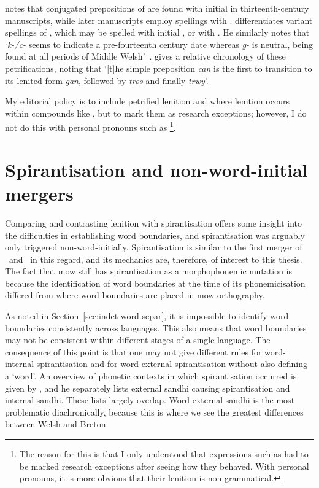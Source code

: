 \Textcite[52]{jongeleen_lenition_2016} notes that conjugated prepositions of  are found with initial   in thirteenth-century manuscripts, while later manuscripts employ spellings with .
\Textcite{sims-williams_variation_2013} differentiates variant spellings of , which may be spelled with initial , or with .
He similarly notes that `\textit{k-/c-} seems to indicate a pre-fourteenth century date whereas \textit{g-} is neutral, being found at all periods of Middle Welsh'~\autocite[24]{sims-williams_variation_2013}. \Textcite[55]{jongeleen_lenition_2016} gives a relative chronology of these petrifications, noting that `[t]he simple preposition \textit{can} is the first to transition to its lenited form \textit{gan}, followed by \textit{tros} and finally \textit{trwy}'.

My editorial policy is to include petrified lenition and where lenition occurs within compounds like , but to mark them as research exceptions; however, I do not do this with personal pronouns such as \footnote{The reason for this is that I only understood that expressions such as  had to be marked research exceptions after seeing how they behaved. With personal pronouns, it is more obvious that their lenition is non-grammatical.}.

\section{Spirantisation and non-word-initial mergers}
\label{sec:spirantization}

Comparing and contrasting lenition with spirantisation offers some insight into the difficulties in establishing word boundaries, and  spirantisation was arguably only triggered non-word-initially.
Spirantisation is similar to the first merger of \lT\ and \xD\ in this regard, and its mechanics are, therefore, of interest to this thesis.
The fact that \gls{mow} still has spirantisation as a morphophonemic mutation is because the identification of word boundaries at the time of its phonemicisation differed from where word boundaries are placed in \gls{mow} orthography.

As noted in Section~\ref{sec:indet-word-separ}, it is impossible to identify word boundaries consistently across languages.
This also means that word boundaries may not be consistent within different stages of a single language.
The consequence of this point is that one may not give different rules for word-internal spirantisation and for word-external spirantisation without also defining a `word'.
An overview of phonetic contexts in which spirantisation occurred is given by \textcite[2--3]{schrijver_spirantization_1999}, and he separately lists external sandhi causing spirantisation and internal sandhi.
These lists largely overlap.
Word-external sandhi is the most problematic diachronically, because this is where we see the greatest differences between Welsh and Breton.

